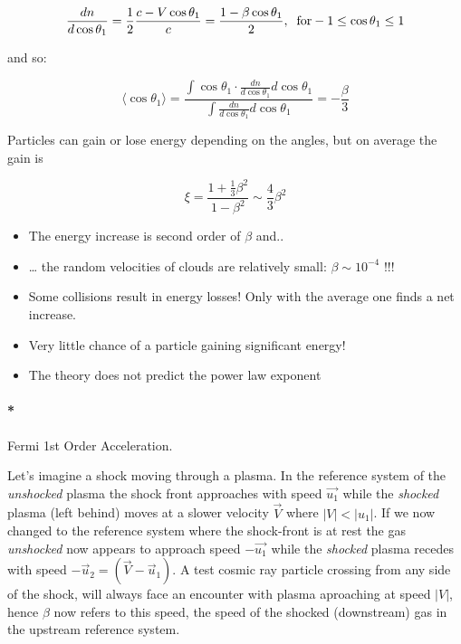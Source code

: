 \documentclass[
  letterpaper,
  DIV=11,
  numbers=noendperiod]{scrreprt}
\let\oldparagraph\paragraph
\renewcommand{\paragraph}[1]{\oldparagraph{#1}\mbox{}}
\providecommand{\tightlist}{%
  \setlength{\itemsep}{0pt}\setlength{\parskip}{0pt}}\usepackage{longtable,booktabs,array}
\begin{document}
\[\frac{dn}{d\cos \theta_1} = \frac{1}{2}\frac{c - V\cos\theta_1}{c}=\frac{1 -\beta \cos\theta_1}{2}, {\;\; \rm for -1 \leq \cos\theta_1 \leq 1}\]

and so:

\[\langle \cos\theta_1\rangle = \frac{\int \cos\theta_1 \cdot \frac{dn}{d\cos\theta_1} d\cos\theta_1}{\int \frac{dn}{d\cos\theta_1}d\cos\theta_1} = - \frac{\beta}{3}\]

Particles can gain or lose energy depending on the angles, but on
average the gain is

\[\xi = \frac{1 + \frac{1}{3}\beta^2}{1 - \beta^2} \sim \frac{4}{3}\beta^2\]

\begin{tcolorbox}[enhanced jigsaw, colframe=quarto-callout-important-color-frame, opacitybacktitle=0.6, left=2mm, leftrule=.75mm, opacityback=0, colbacktitle=quarto-callout-important-color!10!white, breakable, bottomrule=.15mm, toprule=.15mm, colback=white, coltitle=black, bottomtitle=1mm, toptitle=1mm, titlerule=0mm, title=\textcolor{quarto-callout-important-color}{\faExclamation}\hspace{0.5em}{Problems wih the 2nd order acceleration}, arc=.35mm, rightrule=.15mm]

\begin{itemize}
\tightlist
\item
  The energy increase is second order of \(\beta\) and..
\item
  \ldots{} the random velocities of clouds are relatively small:
  \(\beta \sim 10^{-4}\) !!!
\item
  Some collisions result in energy losses! Only with the average one
  finds a net increase.
\item
  Very little chance of a particle gaining significant energy!
\item
  The theory does not predict the power law exponent
\end{itemize}

\end{tcolorbox}

\paragraph*{Fermi 1st Order
Acceleration.}\label{fermi-1st-order-acceleration.}

Let's imagine a shock moving through a plasma. In the reference system
of the \emph{unshocked} plasma the shock front approaches with speed
\(\vec{u_1}\) while the \emph{shocked} plasma (left behind) moves at a
slower velocity \(\vec{V}\) where \(|V| < |u_1|\). If we now changed to
the reference system where the shock-front is at rest the gas
\emph{unshocked} now appears to approach speed \(-\vec{u_1}\) while the
\emph{shocked} plasma recedes with speed
\({-\vec u_2 = (\vec{V} - \vec u_1)}\). A test cosmic ray particle
crossing from any side of the shock, will always face an encounter with
plasma aproaching at speed \(|V|\), hence \(\beta\) now refers to this
speed, the speed of the shocked (downstream) gas in the upstream
reference system.
\end{document}
